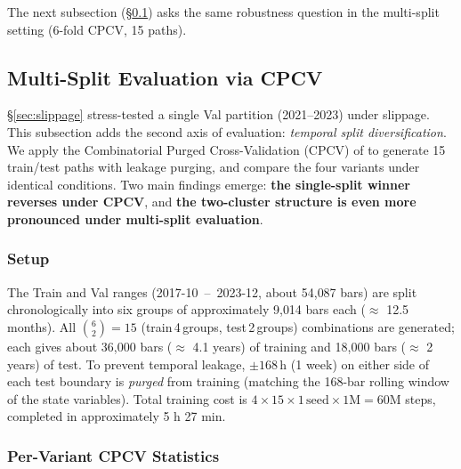 \documentclass[11pt, a4paper]{article}
\begin{document}
The next subsection (\S\ref{sec:cpcv}) asks the same robustness question in
the multi-split setting (6-fold CPCV, 15 paths).

\subsection{Multi-Split Evaluation via CPCV}
\label{sec:cpcv}

\S\ref{sec:slippage} stress-tested a single Val partition (2021--2023) under
slippage. This subsection adds the second axis of evaluation: \emph{temporal
split diversification}. We apply the Combinatorial Purged Cross-Validation
(CPCV) of \citet{lopezdeprado2018advances} to generate 15 train/test paths
with leakage purging, and compare the four variants under identical
conditions. Two main findings emerge: \textbf{the single-split winner
reverses under CPCV}, and \textbf{the two-cluster structure is even more
pronounced under multi-split evaluation}.

\subsubsection{Setup}
\label{sec:cpcv_setup}

The Train and Val ranges (2017-10 \,--\, 2023-12, about 54{,}087 bars) are
split chronologically into six groups of approximately 9{,}014 bars each
($\approx$ 12.5 months). All $\binom{6}{2} = 15$ (train\,4\,groups,
test\,2\,groups) combinations are generated; each gives about 36{,}000 bars
($\approx$ 4.1 years) of training and 18{,}000 bars ($\approx$ 2 years) of
test. To prevent temporal leakage, $\pm 168\,\mathrm{h}$ (1 week) on either
side of each test boundary is \emph{purged} from training (matching the
168-bar rolling window of the state variables). Total training cost is
$4 \times 15 \times 1\,\text{seed} \times 1\mathrm{M} = 60$M steps,
completed in approximately 5 h 27 min.

\subsubsection{Per-Variant CPCV Statistics}
\label{sec:cpcv_per_variant}
\end{document}
